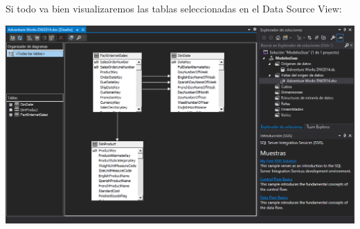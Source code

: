 Si todo va bien visualizaremos las tablas seleccionadas en el Data Source View:
	\begin{center}
	\includegraphics[width=\columnwidth]{images/task1/12}
	\end{center}	